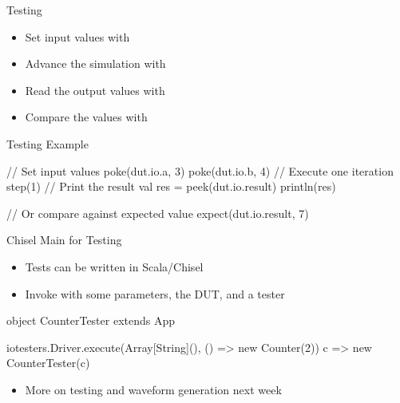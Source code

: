 \begin{frame}[fragile]{Testing}
\begin{itemize}
\item Set input values with 
\item Advance the simulation with 
\item Read the output values with 
\item Compare the values with 
\end{itemize}
\end{frame}

\begin{frame}[fragile]{Testing Example}
\begin{chisel}
// Set input values
poke(dut.io.a, 3)
poke(dut.io.b, 4)
// Execute one iteration
step(1)
// Print the result
val res = peek(dut.io.result)
println(res)

// Or compare against expected value
expect(dut.io.result, 7)
\end{chisel}
\end{frame}

\begin{frame}[fragile]{Chisel Main for Testing}
\begin{itemize}
\item Tests can be written in Scala/Chisel
\item Invoke  with some parameters, the DUT, and a tester
\end{itemize}
\begin{chisel}
object CounterTester extends App {

  iotesters.Driver.execute(Array[String](), () => new Counter(2)) {
    c => new CounterTester(c)
  }
}
\end{chisel}
\begin{itemize}
\item More on testing and waveform generation next week
\end{itemize}
\end{frame}



